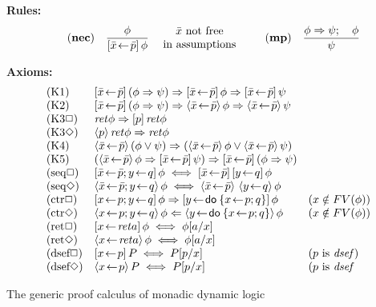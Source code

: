 \begin{myfigure}
  \textbf{Rules:} 
  \begin{displaymath}\displaystyle
    \quad \NRule{nec}{\phi}{\PDLBox{\bar x\leteq\bar p}\phi}
    \mbox{~~\begin{tabular}{c}$\bar x$ not free\\ in assumptions\end{tabular}}
    \qquad
    \NRule{mp}{\phi\Rightarrow\psi;\quad\phi}{\psi}
  \end{displaymath}
  
  \textbf{Axioms:}
  \begin{displaymath}
    \begin{array}{lll}
      \textrm{(K1)} & \PDLBox{\bar x\leteq\bar p}(\phi\Rightarrow\psi)\Rightarrow
      \PDLBox{\bar x\leteq\bar p}\phi\Rightarrow\PDLBox{\bar x\leteq\bar p}\psi\\
      \textrm{(K2)} & \PDLBox{\bar x\leteq\bar p}(\phi\Rightarrow\psi)\Rightarrow
      \PDLDmd{\bar x\leteq\bar p}\phi\Rightarrow\PDLDmd{\bar x\leteq\bar p}\psi\\
      \textrm{(K3$\Box$)} & \ret{\phi}\Rightarrow\PDLBox{p}\ret{\phi}\\
      \textrm{(K3$\Diamond$)} & \PDLDmd{p}\ret{\phi}\Rightarrow\ret{\phi}\\
      \textrm{(K4)} & \PDLDmd{\bar x\leteq\bar p}(\phi\lor\psi)\Rightarrow
      (\PDLDmd{\bar x\leteq\bar p}\phi\lor\PDLDmd{\bar x\leteq\bar
        p}\psi)\\
      \textrm{(K5)} & (\PDLDmd{\bar x\leteq\bar p}\phi\Rightarrow\PDLBox{\bar x\leteq\bar
        p}\psi)
      \Rightarrow
      \PDLBox{\bar x\leteq\bar p}(\phi\Rightarrow\psi)\\
      \textrm{(seq$\Box$)} & \PDLBox{\bar x\leteq\bar p;y\leteq q}\phi \iff
      \PDLBox{\bar x\leteq\bar p}\PDLBox{y\leteq q}\phi\\
      \textrm{(seq$\Diamond$)} & \PDLDmd{\bar x\leteq\bar p; y\leteq q}\phi\iff
      \PDLDmd{\bar x\leteq\bar p}\,\PDLDmd{y\leteq q}\phi\\
      \textrm{(ctr$\Box$)} &
      \PDLBox{x\leteq p; y\leteq  q}\phi\Rightarrow
      \PDLBox{ y\leteq\DoStmt{ x\leteq p; q}}\phi
      & (x\notin FV(\phi))\\
      \textrm{(ctr$\Diamond$)} & \PDLDmd{ x\leteq p; y\leteq
        q}\phi \Leftarrow   \PDLDmd{ y\leteq\DoStmt{ x\leteq p; q}}\phi& (x\notin FV(\phi))\\
      \textrm{(ret$\Box$)} & \PDLBox{x\leteq \ret{a}}\phi\iff\phi[a/x]\\
      \textrm{(ret$\Diamond$)} & 
      \PDLDmd{x\leteq \ret{a}}\phi\iff\phi[a/x] \\
      \textrm{(dsef$\Box$)} & \PDLBox{x\leteq p}{P}\iff P[p/x]& (p \text{ is }
      \op{dsef}) \\
      \textrm{(dsef$\Diamond$)} & \PDLDmd{x\leteq p}{P} \iff  P[p/x] & (p \text{ is }
      \op{dsef} 
    \end{array}
  \end{displaymath}
  \mylinesep
  \caption{The generic proof calculus of monadic dynamic logic}
  \label{fig:mon-dyn-logic}
\end{myfigure}

